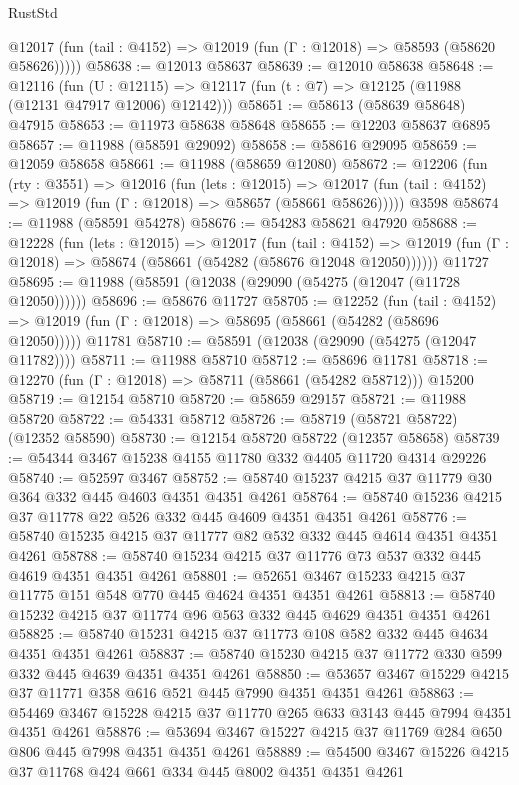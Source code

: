 \begin{lexlean}{RustStd}
\begin{coremodule}
      @12017 (fun (tail : @4152) => @12019 (fun (Γ : @12018) => @58593 (@58620 @58626)))))
@58638 := @12013 @58637
@58639 := @12010 @58638
@58648 := @12116
    (fun (U : @12115) => @12117 (fun (t : @7) => @12125 (@11988 (@12131 @47917 @12006) @12142)))
@58651 := @58613 (@58639 @58648) @47915
@58653 := @11973 @58638 @58648
@58655 := @12203 @58637 @6895
@58657 := @11988 (@58591 @29092)
@58658 := @58616 @29095
@58659 := @12059 @58658
@58661 := @11988 (@58659 @12080)
@58672 := @12206
    (fun (rty : @3551) =>
    @12016
      (fun (lets : @12015) =>
      @12017 (fun (tail : @4152) => @12019 (fun (Γ : @12018) => @58657 (@58661 @58626)))))
    @3598
@58674 := @11988 (@58591 @54278)
@58676 := @54283 @58621 @47920
@58688 := @12228
    (fun (lets : @12015) =>
    @12017
      (fun (tail : @4152) =>
      @12019 (fun (Γ : @12018) => @58674 (@58661 (@54282 (@58676 @12048 @12050))))))
    @11727
@58695 := @11988 (@58591 (@12038 (@29090 (@54275 (@12047 (@11728 @12050))))))
@58696 := @58676 @11727
@58705 := @12252
    (fun (tail : @4152) => @12019 (fun (Γ : @12018) => @58695 (@58661 (@54282 (@58696 @12050)))))
    @11781
@58710 := @58591 (@12038 (@29090 (@54275 (@12047 @11782))))
@58711 := @11988 @58710
@58712 := @58696 @11781
@58718 := @12270 (fun (Γ : @12018) => @58711 (@58661 (@54282 @58712))) @15200
@58719 := @12154 @58710
@58720 := @58659 @29157
@58721 := @11988 @58720
@58722 := @54331 @58712
@58726 := @58719 (@58721 @58722) (@12352 @58590)
@58730 := @12154 @58720 @58722 (@12357 @58658)
@58739 := @54344 @3467 @15238 @4155 @11780 @332 @4405 @11720 @4314 @29226
@58740 := @52597 @3467
@58752 := @58740 @15237 @4215 @37 @11779 @30 @364 @332 @445 @4603 @4351 @4351 @4261
@58764 := @58740 @15236 @4215 @37 @11778 @22 @526 @332 @445 @4609 @4351 @4351 @4261
@58776 := @58740 @15235 @4215 @37 @11777 @82 @532 @332 @445 @4614 @4351 @4351 @4261
@58788 := @58740 @15234 @4215 @37 @11776 @73 @537 @332 @445 @4619 @4351 @4351 @4261
@58801 := @52651 @3467 @15233 @4215 @37 @11775 @151 @548 @770 @445 @4624 @4351 @4351 @4261
@58813 := @58740 @15232 @4215 @37 @11774 @96 @563 @332 @445 @4629 @4351 @4351 @4261
@58825 := @58740 @15231 @4215 @37 @11773 @108 @582 @332 @445 @4634 @4351 @4351 @4261
@58837 := @58740 @15230 @4215 @37 @11772 @330 @599 @332 @445 @4639 @4351 @4351 @4261
@58850 := @53657 @3467 @15229 @4215 @37 @11771 @358 @616 @521 @445 @7990 @4351 @4351 @4261
@58863 := @54469 @3467 @15228 @4215 @37 @11770 @265 @633 @3143 @445 @7994 @4351 @4351 @4261
@58876 := @53694 @3467 @15227 @4215 @37 @11769 @284 @650 @806 @445 @7998 @4351 @4351 @4261
@58889 := @54500 @3467 @15226 @4215 @37 @11768 @424 @661 @334 @445 @8002 @4351 @4351 @4261

\end{coremodule}
\end{lexlean}

